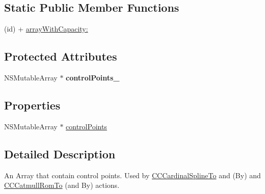 \subsection*{Static Public Member Functions}
\begin{DoxyCompactItemize}
\item 
(id) + \hyperlink{interface_c_c_point_array_a628506617fe219d638a9be6a06992ff2}{array\-With\-Capacity\-:}
\end{DoxyCompactItemize}
\subsection*{Protected Attributes}
\begin{DoxyCompactItemize}
\item 
\hypertarget{interface_c_c_point_array_a1168a70f6969c8b31c23c862678b1c2d}{N\-S\-Mutable\-Array $\ast$ {\bfseries control\-Points\-\_\-}}\label{interface_c_c_point_array_a1168a70f6969c8b31c23c862678b1c2d}

\end{DoxyCompactItemize}
\subsection*{Properties}
\begin{DoxyCompactItemize}
\item 
N\-S\-Mutable\-Array $\ast$ \hyperlink{interface_c_c_point_array_afdf0e4f9008cd5a8347fa8368e9a0c45}{control\-Points}
\end{DoxyCompactItemize}


\subsection{Detailed Description}
An Array that contain control points. Used by \hyperlink{interface_c_c_cardinal_spline_to}{C\-C\-Cardinal\-Spline\-To} and (By) and \hyperlink{interface_c_c_catmull_rom_to}{C\-C\-Catmull\-Rom\-To} (and By) actions. 

